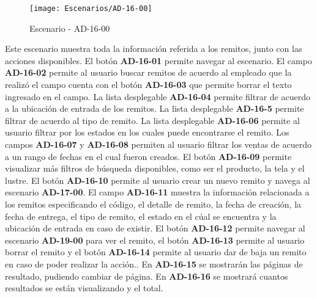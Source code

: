 \begin{figure}[H]
\centering
\texttt{[image: Escenarios/AD-16-00]}
\caption{Escenario - AD-16-00}
\label{fig:AD-16-00}
\end{figure}
Este escenario muestra toda la información referida a los remitos, junto con las acciones disponibles.
El botón \textbf{AD-16-01} permite navegar al escenario. El campo \textbf{AD-16-02} permite al usuario buscar remitos de acuerdo al empleado que la realizó el campo cuenta con el botón \textbf{AD-16-03} que permite borrar el texto ingresado en el campo. La lista desplegable \textbf{AD-16-04} permite filtrar de acuerdo a la ubicación de entrada de los remitos. La lista desplegable \textbf{AD-16-5} permite filtrar de acuerdo al tipo de remito. La lista desplegable \textbf{AD-16-06} permite al usuario filtrar por los estados en los cuales puede encontrarse el remito.  Los campos \textbf{AD-16-07} y \textbf{AD-16-08} permiten al usuario filtrar los ventas de acuerdo a un rango de fechas en el cual fueron creados. El botón \textbf{AD-16-09} permite visualizar más filtros de búsqueda disponibles, como ser el producto, la tela y el lustre.
El botón \textbf{AD-16-10} permite al usuario crear un nuevo remito y navega al escenario \textbf{AD-17-00}.
El campo \textbf{AD-16-11} muestra la información relacionada a los remitos especificando el código, el detalle de remito, la fecha de creación, la fecha de entrega, el tipo de remito, el estado en el cúal se encuentra y la ubicación de entrada en caso de existir. El botón \textbf{AD-16-12} permite navegar al escenario \textbf{AD-19-00} para ver el remito, el botón \textbf{AD-16-13} permite al usuario borrar el remito y el botón \textbf{AD-16-14} permite al usuario dar de baja un remito en caso de poder realizar la acción.. 
En \textbf{AD-16-15} se mostrarán las páginas de resultado, pudiendo cambiar de página. En \textbf{AD-16-16} se mostrará cuantos resultados se están visualizando y el total.
\\
